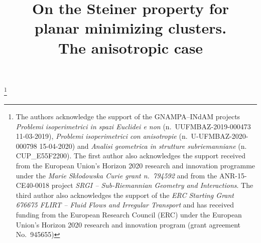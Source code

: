 \documentclass[JEP,XML,SOM,Unicode,NoFloatCountersInSection]{cedram}
\theoremstyle{plain}
\theoremstyle{definition}
\begin{document}
\frontmatter
\title[Steiner property for planar clusters. Anisotropic case]{On the Steiner property for\\ planar minimizing clusters.\\ The anisotropic case}

\author[\initial{V.} \lastname{Franceschi}]{ }
\address{Dipartimento di Matematica Tullio Levi-Civita\\
Via Trieste 63, 35121 Padova PD, Italy}

\author[\initial{A.} \lastname{Pratelli}]{ }
\address{Department of Mathematics, University of Pisa\\
Largo Bruno Pontecorvo 5, 56127 Pisa PI, Italy}

\author[\initial{G.} \lastname{Stefani}]{ }
\address{Scuola Internazionale Superiore di Studi Avanzati (SISSA)\\
Via Bonomea 265, 34136 Trieste, Italy}

\thanks{The authors acknowledge the support of the GNAMPA--INdAM projects \emph{Problemi isoperimetrici in spazi Euclidei e non} (n.\ UUFMBAZ-2019-000473 11-03-2019), \textit{Problemi isoperimetrici con anisotropie} (n.\ U-UFMBAZ-2020-000798 15-04-2020) and \textit{Analisi geometrica in strutture subriemanniane} (n. CUP\_E55F2200).
The first author also acknowledges the support received from the European Union's Horizon 2020 research and innovation programme under the \textit{Marie Sk\l o\-dowska Curie grant n.\ 794592} and from the ANR-15-CE40-0018 project \textit{SRGI -- Sub-Riemannian Geometry and Interactions}.
The third author also acknowledges the support of the \textit{ERC Starting
Grant 676675 FLIRT – Fluid Flows and Irregular Transport} and has received funding from the European Research Council (ERC) under the European Union’s Horizon 2020 research and innovation program (grant agreement No.~945655)}


\end{document}
